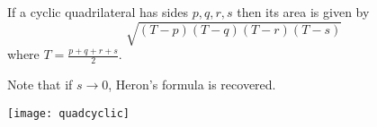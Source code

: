 \documentclass[12pt]{article}
\begin{document}
If a cyclic quadrilateral has sides $p,q,r,s$ then its area is given by
$$\sqrt{(T-p)(T-q)(T-r)(T-s)}$$
where $T=\frac{p+q+r+s}{2}$.

Note that if $s\to 0$, Heron's formula is recovered.

\begin{center}
\texttt{[image: quadcyclic]}
\end{center}
\end{document}
